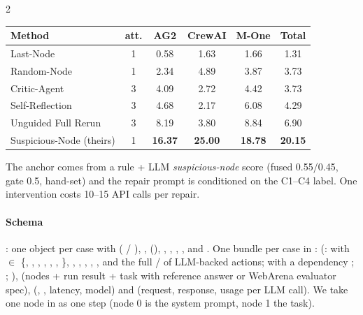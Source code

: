 \begin{multicols}{2}
\begin{center}\small\setlength{\tabcolsep}{3.5pt}
\begin{tabular}{@{}lccccc@{}}\toprule
Method & att. & AG2 & CrewAI & M-One & Total\\\midrule
Last-Node & 1 & 0.58 & 1.63 & 1.66 & 1.31\\
Random-Node & 1 & 2.34 & 4.89 & 3.87 & 3.73\\
Critic-Agent & 3 & 4.09 & 2.72 & 4.42 & 3.73\\
Self-Reflection & 3 & 4.68 & 2.17 & 6.08 & 4.29\\
Unguided Full Rerun & 3 & 8.19 & 3.80 & 8.84 & 6.90\\
Suspicious-Node (theirs) & 1 & \textbf{16.37} & \textbf{25.00} & \textbf{18.78} & \textbf{20.15}\\\bottomrule
\end{tabular}
\end{center}
The anchor comes from a rule + LLM \emph{suspicious-node} score (fused 0.55/0.45, gate 0.5, hand-set) and the repair prompt is conditioned on the C1--C4 label. One intervention costs 10--15 API calls per repair.

\paragraph{Schema} : one object per case with  ( / ), ,  (), , , , ,  and . One bundle per case in :  (:  with  $\in$ \{, , , , , , \}, , , , , ,  and the full  /  of LLM-backed actions;  with a dependency ; ; ),  (nodes + run result + task with reference answer or WebArena evaluator spec),  (, , latency, model) and  (request, response, usage per LLM call). We take one node in  as one step (node 0 is the system prompt, node 1 the task).
\end{multicols}

